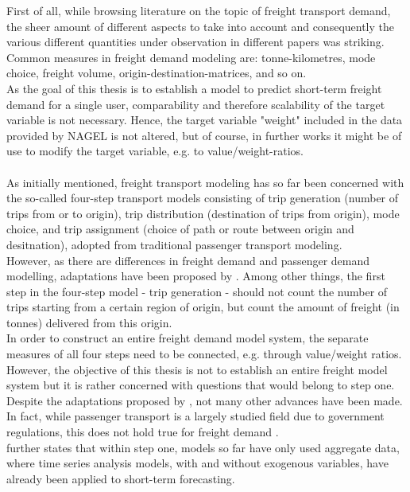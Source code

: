 \documentclass[a4paper, 11pt]{article}
\begin{document}
First of all, while browsing literature on the topic of freight transport demand, the sheer amount of different aspects to take into account and consequently the various different quantities under observation in different papers was striking. Common measures in freight demand modeling are: tonne-kilometres, mode choice, freight volume, origin-destination-matrices, and so on.\\
As the goal of this thesis is to establish a model to predict short-term freight demand for a single user, comparability and therefore scalability of the target variable is not necessary. Hence, the target variable "weight" included in the data provided by NAGEL is not altered, but of course, in further works it might be of use to modify the target variable, e.g. to value/weight-ratios.
\\
\\
As initially mentioned, freight transport modeling has so far been concerned with the so-called four-step transport models consisting of trip generation (number of trips from or to origin), trip distribution (destination of trips from origin), mode choice, and trip assignment (choice of path or route between origin and desitnation), adopted from traditional passenger transport modeling\citep{JONG.2004, TransportandInfrastructureCouncil.2016}.
\\
However, as there are differences in freight demand and passenger demand modelling, adaptations have been proposed by \cite{JONG.2004}.
Among other things, the first step in the four-step model - trip generation - should not count the number of trips starting from a certain region of origin, but count the amount of freight (in tonnes) delivered from this origin.\\
In order to construct an entire freight demand model system, the separate measures of all four steps need to be connected, e.g. through value/weight ratios.\\
However, the objective of this thesis is not to establish an entire freight model system but it is rather concerned with questions that would belong to step one.\\
Despite the adaptations proposed by \cite{JONG.2004}, not many other advances have been made. In fact, while passenger transport is a largely studied field due to government regulations, this does not hold true for freight demand \citep{Regan.2001}.\\
\cite{JONG.2004} further states that within step one, models so far have only used aggregate data, where time series analysis models, with and without exogenous variables, have already been applied to short-term forecasting.\\
\end{document}
